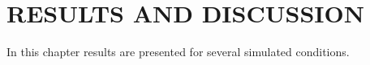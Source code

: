 %
%
%
%
%
%
%

\chapter{RESULTS AND DISCUSSION} \label{chapter:Results}
In this chapter results are presented for several simulated conditions.

